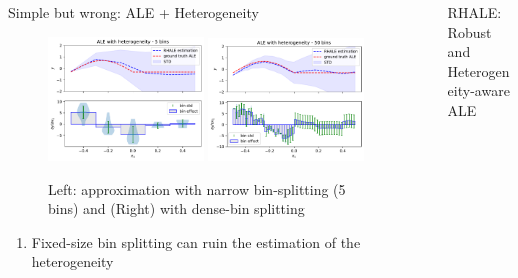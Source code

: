 \documentclass[final]{beamer}
\newlength{\sepwidth}
\newlength{\colwidth}
\newcommand{\separatorcolumn}{\begin{column}{\sepwidth}\end{column}}
\begin{document}
\begin{frame}[t]
\begin{columns}[t]
\begin{column}{\colwidth}
\begin{defbox}{Simple but wrong: ALE + Heterogeneity}{}
        \begin{figure}
          \centering
          \includegraphics[width=0.49\textwidth]{./../code/concept_figure/exp_1_rhale_5_bins_0.pdf}
          \includegraphics[width=0.49\textwidth]{./../code/concept_figure/exp_1_rhale_50_bins_0.pdf}
          \caption{Left: approximation with narrow bin-splitting (5 bins) and (Right) with dense-bin splitting}
          \label{fig:acc-1}
        \end{figure}

        \vspace{2mm}

        \begin{enumerate}
        \item Fixed-size bin splitting can ruin the estimation of the heterogeneity
        \end{enumerate}

  \end{defbox}

\end{column}

\separatorcolumn
\begin{column}{\colwidth}

  \begin{block}{RHALE: Robust and Heterogeneity-aware ALE}


\end{block}
\end{column}
\end{columns}
\end{frame}
\end{document}
